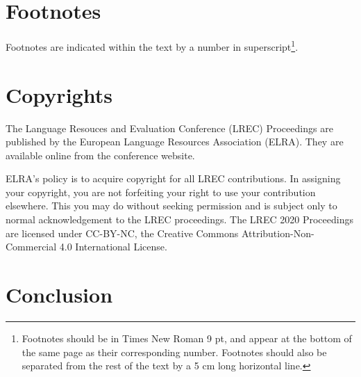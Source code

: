 \documentclass[10pt, a4paper]{article}
\begin{document}
%
%
%
%
%

\section{Footnotes}

Footnotes are indicated within the text by a number in superscript\footnote{Footnotes should be in Times New Roman 9 pt, and appear at the bottom of the same page as their corresponding number. Footnotes should also be separated from the rest of the text by a 5 cm long horizontal line.}.

\section{Copyrights}

The Language Resouces and Evaluation Conference (LREC) Proceedings are published by the European Language Resources Association (ELRA).
They are available online from the conference website.

ELRA's policy is to acquire copyright for all LREC contributions. In assigning your copyright, you are not forfeiting your right to use your contribution elsewhere. This you may do without seeking permission and is subject only to normal acknowledgement to the LREC proceedings. The LREC 2020 Proceedings are licensed under CC-BY-NC, the Creative Commons Attribution-Non-Commercial 4.0 International License.

\section{Conclusion}
\end{document}
